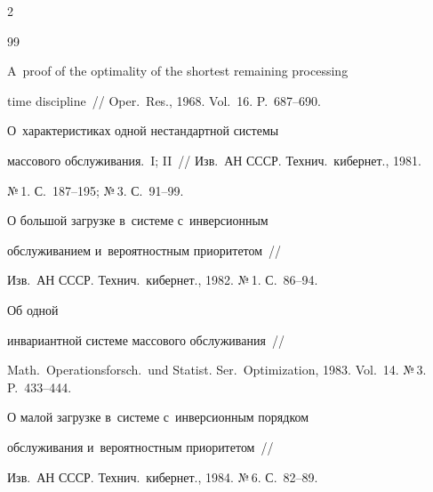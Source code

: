 \begin{multicols}{2}
{{\begin{thebibliography}{99}


 A~proof of the optimality of the shortest remaining processing


time discipline~// Oper.\ Res., 1968. Vol.~16. P.~687--690.















О~характеристиках одной нестандартной системы


массового обслуживания.~I; II~// Изв.\ АН СССР. Технич.\ кибернет., 1981.


№\,1. С.~187--195; №\,3. С.~91--99.









О большой загрузке в~системе с~инверсионным


обслуживанием и~вероятностным приоритетом~//


Изв.\ АН СССР. Технич.\ кибернет., 1982. №\,1. С.~86--94.







 Об одной


инвариантной системе массового обслуживания~//


Math.\ Operationsforsch.\ und Statist. Ser.\ Optimization, 1983. Vol.~14. №\,3. P.~433--444.















О малой загрузке в~сис\-те\-ме с~инверсионным порядком


обслуживания и~вероятностным приоритетом~//


Изв.\ АН СССР. Технич.\ кибернет., 1984. №\,6. С.~82--89.








\end{thebibliography}}}
\end{multicols}
